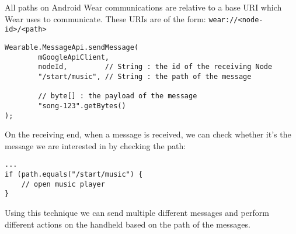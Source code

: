All paths on Android Wear communications are relative to a base URI which Wear
uses to communicate. These URIs are of the form:
\texttt{wear://<node-id>/<path>}

\begin{lstlisting}
Wearable.MessageApi.sendMessage(
        mGoogleApiClient,
        nodeId,         // String : the id of the receiving Node
        "/start/music", // String : the path of the message

        // byte[] : the payload of the message
        "song-123".getBytes()
);
\end{lstlisting}

On the receiving end, when a message is received, we can check whether it's the
message we are interested in by checking the path:

\begin{lstlisting}
...
if (path.equals("/start/music") {
    // open music player
}
\end{lstlisting}

Using this technique we can send multiple different messages and perform
different actions on the handheld based on the path of the messages.

